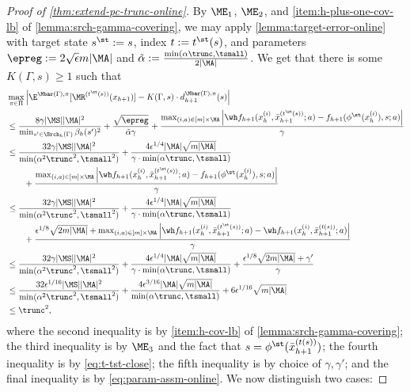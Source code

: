 \begin{proof}[Proof of \cref{thm:extend-pc-trunc-online}]
By $\ME_1$, $\ME_2$, and \cref{item:h-plus-one-cov-lb} of \cref{lemma:srch-gamma-covering}, we may apply \cref{lemma:target-error-online} with target state $s^\st := s$, index $t := t^\st(s)$, and parameters $\epreg := 2\sqrt{\epsilon}m|\MA|$ and $\tilde \alpha := \frac{\min(\alpha\trunc,\tsmall)}{2|\MA|}$. We get that there is some $K(\Gamma,s) \geq 1$ such that
\begin{align}
&\max_{\pi\in\Pi} \left|\E^{\Mbar(\Gamma),\pi}[\MR^{(t^\st(s))}(x_{h+1})] - K(\Gamma,s) \cdot d^{\Mbar(\Gamma),\pi}_{h+1}(s)\right|  \nonumber\\ 
&\leq \frac{8\gamma|\MS||\MA|^2}{\min_{s'\in\Srch_h(\Gamma)}\beta_h(s')^2} + \frac{\sqrt{\epreg}}{\tilde \alpha \gamma} + \frac{\max_{(i,a)\in[m]\times\MA}\left|\wh f_{h+1}(x_h^{(i)},\bar x_{h+1}^{(t^\st(s))};a) - f_{h+1}(\phi^\st(x_h^{(i)}),s;a)\right|}{\gamma} \nonumber\\
&\leq \frac{32\gamma|\MS||\MA|^2}{\min(\alpha^2\trunc^2,\tsmall^2)} + \frac{4\epsilon^{1/4}|\MA|\sqrt{m|\MA|}}{\gamma \cdot \min(\alpha\trunc,\tsmall)} \nonumber\\
&\qquad+ \frac{\max_{(i,a)\in[m]\times\MA}\left|\wh f_{h+1}(x_h^{(i)},\bar x^{(t^\st(s))}_{h+1};a) - f_{h+1}(\phi^\st(x_h^{(i)}),s;a)\right|}{\gamma} \nonumber \\
&\leq \frac{32\gamma|\MS||\MA|^2}{\min(\alpha^2\trunc^2,\tsmall^2)} + \frac{4\epsilon^{1/4}|\MA|\sqrt{m|\MA|}}{\gamma \cdot \min(\alpha\trunc,\tsmall)} \nonumber \\ 
&\qquad+ \frac{\epsilon^{1/8}\sqrt{2m|\MA|}+\max_{(i,a)\in[m]\times\MA}\left|\wh f_{h+1}(x_h^{(i)},\bar x^{(t^\st(s))}_{h+1};a) - \wh f_{h+1}(x_h^{(i)},\bar x_{h+1}^{(t(s))};a)\right|}{\gamma} \nonumber \\
&\leq \frac{32\gamma|\MS||\MA|^2}{\min(\alpha^2\trunc^2,\tsmall^2)} + \frac{4\epsilon^{1/4}|\MA|\sqrt{m|\MA|}}{\gamma \cdot \min(\alpha\trunc,\tsmall)} + \frac{\epsilon^{1/8}\sqrt{2m|\MA|}+\gamma'}{\gamma} \nonumber \\
&\leq \frac{32\epsilon^{1/16}|\MS||\MA|^2}{\min(\alpha^2\trunc^2,\tsmall^2)} + \frac{4\epsilon^{3/16}|\MA|\sqrt{m|\MA|}}{\min(\alpha\trunc,\tsmall)} + 6\epsilon^{1/16}\sqrt{m|\MA|} \nonumber \\
&\leq \trunc^2,\label{eq:rkd-error-online}
\end{align}
where the second inequality is by \cref{item:h-cov-lb} of \cref{lemma:srch-gamma-covering}; the third inequality is by $\ME_3$ and the fact that $s = \phi^\st(\bar x_{h+1}^{(t(s))})$; the fourth inequality is by \cref{eq:t-tst-close}; the fifth inequality is by choice of $\gamma,\gamma'$; and the final inequality is by \cref{eq:param-assm-online}. We now distinguish two cases:


\end{proof}
